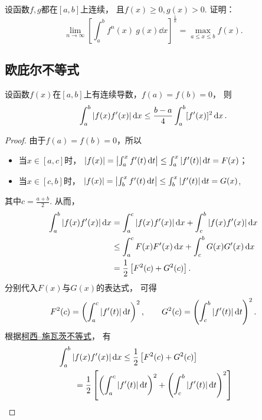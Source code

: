 \begin{example}
设函数\(f,g\)都在\([a,b]\)上连续，
且\(f(x)\geq0,
g(x)>0\).
证明：\[
	\lim_{n\to\infty} \left[ \int_a^b f^n(x)~g(x) \dd{x} \right]^{\frac1n}
	= \max_{a \leq x \leq b} f(x).
\]
\end{example}

\subsection{欧庇尔不等式}
\begin{theorem}[欧庇尔不等式]\label{theorem:定积分.欧庇尔不等式}
设函数\(f(x)\)在\([a,b]\)上有连续导数，\(f(a)=f(b)=0\)，
则\begin{equation}\label{equation:定积分.欧庇尔不等式}
	\int_a^b \abs{f(x) f'(x)} \dd{x}
	\leq \frac{b-a}{4}
	\int_a^b [f'(x)]^2 \dd{x}.
\end{equation}
\begin{proof}
由于\(f(a)=f(b)=0\)，所以\begin{itemize}
	\item 当\(x \in \left[a,c\right]\)时，
	\(\abs{f(x)} = \abs{\int_a^x f'(t) \dd{t}} \leq \int_a^x \abs{f'(t)} \dd{t} = F(x)\)；
	\item 当\(x \in \left[c,b\right]\)时，
	\(\abs{f(x)} = \abs{\int_b^x f'(t) \dd{t}} \leq \int_b^x \abs{f'(t)} \dd{t} = G(x)\),
\end{itemize}
其中\(c=\frac{a+b}{2}\).
从而，\begin{align*}
	\int_a^b \abs{f(x) f'(x)} \dd{x}
	&= \int_a^c \abs{f(x) f'(x)} \dd{x}
		+ \int_c^b \abs{f(x) f'(x)} \dd{x} \\
	&\leq \int_a^c F(x) F'(x) \dd{x}
		+ \int_c^b G(x) G'(x) \dd{x} \\
	&= \frac{1}{2} \left[ F^2(c) + G^2(c) \right].
\end{align*}
分别代入\(F(x)\)与\(G(x)\)的表达式，
可得\[
	F^2(c) = \left( \int_a^c \abs{f'(t)} \dd{t} \right)^2,
	\qquad
	G^2(c) = \left( \int_c^b \abs{f'(t)} \dd{t} \right)^2.
\]
根据\hyperref[equation:定积分.柯西--施瓦茨不等式]{柯西--施瓦茨不等式}，
有\begin{align*}
	&\hspace{-20pt}\int_a^b{\abs{f(x) f'(x)} \dd{x}}
	\leq \frac{1}{2} \left[
		F^2(c)
		+ G^2(c)
		\right] \\
	&= \frac{1}{2} \left[
		\left(\int_a^c{\abs{f'(t)}\dd{t}}\right)^2
		+\left(\int_c^b{\abs{f'(t)}\dd{t}}\right)^2
		\right] \\

\end{align*}
\end{proof}
\end{theorem}

